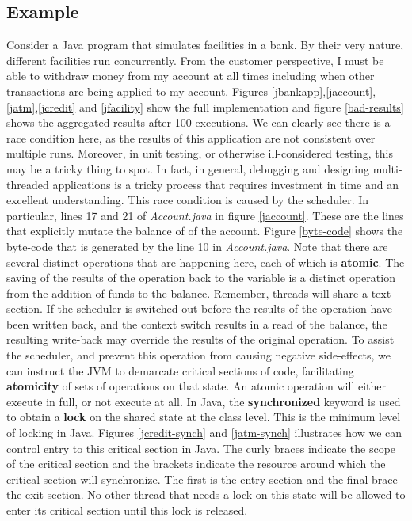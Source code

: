 \documentclass[10pt,a4paper]{article}
\begin{document}
\subsection{Example}
Consider a Java program that simulates facilities in a bank. By their very nature, different facilities run concurrently. From the customer perspective, I must be able to withdraw money from my account at all times including when other transactions are being applied to my account. Figures  \ref{jbankapp},\ref{jaccount},\ref{jatm},\ref{jcredit} and \ref{jfacility} show the full implementation and figure \ref{bad-results} shows the aggregated results after 100 executions.  We can clearly see there is a race condition here, as the results of this application are not consistent over multiple runs. Moreover, in unit testing, or otherwise ill-considered testing, this may be a tricky thing to spot. In fact, in general, debugging and designing multi-threaded applications is a tricky process that requires investment in time and an excellent understanding. 
\newline\newline
This race condition is caused by the scheduler. In particular, lines 17 and 21 of {\it Account.java} in figure \ref{jaccount}. These are the lines that explicitly mutate the balance of of the account. Figure \ref{byte-code} shows the byte-code that is generated by the line 10 in {\it Account.java}. Note that there are several distinct operations that are happening here, each of which is {\bf atomic}. The saving of the results of the operation back to the variable is a distinct operation from the addition of funds to the balance. Remember, threads will share a text-section. If the scheduler is switched out before the results of the operation have been written back, and the context switch results in a read of the balance, the resulting write-back may override the results of the original operation. To assist the scheduler, and prevent this operation from causing negative side-effects, we can instruct the JVM to demarcate critical sections of code, facilitating {\bf atomicity} of sets of operations on that state. An atomic operation will either execute in full, or not execute at all. In Java, the {\bf synchronized} keyword is used to obtain a {\bf lock} on the shared state at the class level. This is the minimum level of locking in Java. Figures \ref{jcredit-synch} and \ref{jatm-synch} illustrates how we can control entry to this critical section in Java. The curly braces indicate the scope of the critical section and the brackets indicate the resource around which the critical section will synchronize. The first is the entry section and the final brace the exit section. No other thread that needs a lock on this state will be allowed to enter its critical section until this lock is released. 
\end{document}
